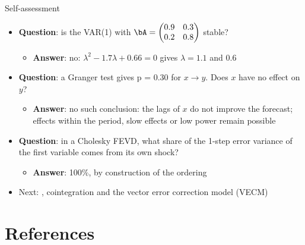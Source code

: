 \begin{frame}{Self-assessment}
\itemsize{\small}
\begin{itemize}
    \item \textbf{Question}: is the VAR(1) with $\bA = \begin{pmatrix} 0.9 & 0.3 \\ 0.2 & 0.8 \end{pmatrix}$ stable?
    \begin{itemize}
        \item \textbf{Answer}: no: $\lambda^2 - 1.7\lambda + 0.66 = 0$ gives $\lambda = 1.1$ and $0.6$
    \end{itemize}
    \item \textbf{Question}: a Granger test gives p = 0.30 for $x \to y$. Does $x$ have no effect on $y$?
    \begin{itemize}
        \item \textbf{Answer}: no such conclusion: the lags of $x$ do not improve the forecast; effects within the period, slow effects or low power remain possible
    \end{itemize}
    \item \textbf{Question}: in a Cholesky FEVD, what share of the 1-step error variance of the first variable comes from its own shock?
    \begin{itemize}
        \item \textbf{Answer}: 100\%, by construction of the ordering
    \end{itemize}
    \item Next: , cointegration and the vector error correction model (VECM)
\end{itemize}
\end{frame}


\section{References}

